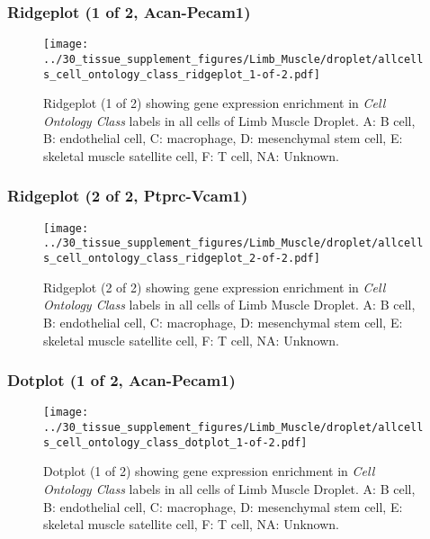 \clearpage

\subsubsection{Ridgeplot (1 of 2, Acan-Pecam1)}
\begin{figure}[h]
\centering
\texttt{[image: ../30\_tissue\_supplement\_figures/Limb\_Muscle/droplet/allcells\_cell\_ontology\_class\_ridgeplot\_1-of-2.pdf]}

\caption{ Ridgeplot (1 of 2)  showing gene expression enrichment in \emph{Cell Ontology Class} labels in all cells of Limb Muscle Droplet. A: B cell, B: endothelial cell, C: macrophage, D: mesenchymal stem cell, E: skeletal muscle satellite cell, F: T cell, NA: Unknown.}
\end{figure}


\clearpage

\subsubsection{Ridgeplot (2 of 2, Ptprc-Vcam1)}
\begin{figure}[h]
\centering
\texttt{[image: ../30\_tissue\_supplement\_figures/Limb\_Muscle/droplet/allcells\_cell\_ontology\_class\_ridgeplot\_2-of-2.pdf]}

\caption{ Ridgeplot (2 of 2)  showing gene expression enrichment in \emph{Cell Ontology Class} labels in all cells of Limb Muscle Droplet. A: B cell, B: endothelial cell, C: macrophage, D: mesenchymal stem cell, E: skeletal muscle satellite cell, F: T cell, NA: Unknown.}
\end{figure}


\clearpage

\subsubsection{Dotplot (1 of 2, Acan-Pecam1)}
\begin{figure}[h]
\centering
\texttt{[image: ../30\_tissue\_supplement\_figures/Limb\_Muscle/droplet/allcells\_cell\_ontology\_class\_dotplot\_1-of-2.pdf]}

\caption{ Dotplot (1 of 2)  showing gene expression enrichment in \emph{Cell Ontology Class} labels in all cells of Limb Muscle Droplet. A: B cell, B: endothelial cell, C: macrophage, D: mesenchymal stem cell, E: skeletal muscle satellite cell, F: T cell, NA: Unknown.}
\end{figure}


